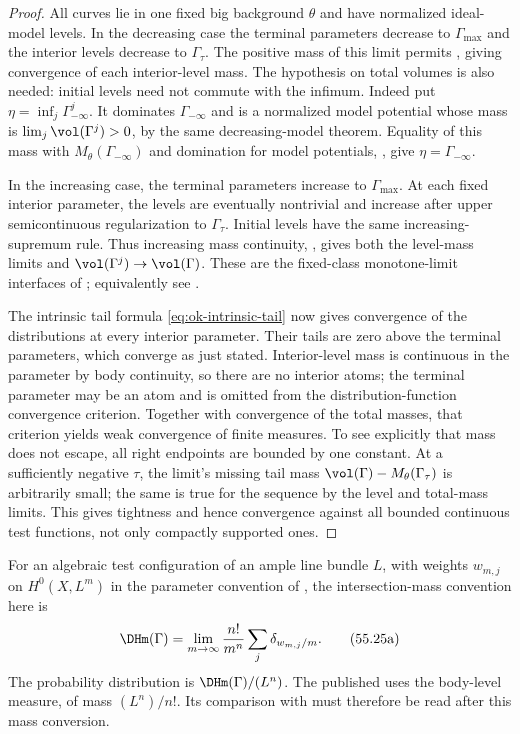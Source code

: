 \begin{proof}
All curves lie in one fixed big background $\theta$ and have normalized
ideal-model levels.  In the decreasing case the terminal parameters decrease
to $\Gamma_{\max}$ and the interior levels decrease to $\Gamma_\tau$.
The positive mass of this limit permits
\cite[Proposition~3.1.12 and Corollary~6.2.6]{XiaBook}, giving convergence
of each interior-level mass.  The hypothesis on total volumes is also needed:
initial levels need not commute with the infimum.
Indeed put $\eta=\inf_j\Gamma^j_{-\infty}$.  It dominates
$\Gamma_{-\infty}$ and is a normalized model potential whose mass is
$\lim_j\vol(\Gamma^j)>0$, by the same decreasing-model theorem.
Equality of this mass with $M_\theta(\Gamma_{-\infty})$ and domination
for model potentials, \cite[Proposition~6.1.1]{XiaBook}, give
$\eta=\Gamma_{-\infty}$.

In the increasing case, the terminal parameters increase to
$\Gamma_{\max}$.  At each fixed interior parameter, the levels are eventually
nontrivial and increase after upper semicontinuous regularization to
$\Gamma_\tau$.  Initial levels have the same increasing-supremum rule.
Thus increasing mass continuity, , gives
both the level-mass limits and $\vol(\Gamma^j)\to\vol(\Gamma)$.
These are the fixed-class monotone-limit interfaces of
; equivalently see
\cite[Proposition~13.3.1]{XiaBook}.

The intrinsic tail formula \eqref{eq:ok-intrinsic-tail} now gives convergence
of the distributions at every interior parameter.  Their tails are zero
above the terminal parameters, which converge as just stated.
Interior-level mass is continuous in the parameter by body continuity, so
there are no interior atoms; the terminal parameter may be an atom and is
omitted from the distribution-function convergence criterion.
Together with convergence of the total masses, that criterion yields weak
convergence of finite measures.  To see explicitly that mass does not escape,
all right endpoints are bounded by one constant.  At a sufficiently negative
$\tau$, the limit's missing tail mass
$\vol(\Gamma)-M_\theta(\Gamma_\tau)$ is arbitrarily small; the same is true
for the sequence by the level and total-mass limits.
This gives tightness and hence convergence against all bounded continuous
test functions, not only compactly supported ones.
\end{proof}

For an algebraic test configuration of an ample line bundle $L$, with
weights $w_{m,j}$ on $H^0(X,L^m)$ in the parameter convention of
, the intersection-mass convention here is
\[
 \DHm(\Gamma)
 =\lim_{m\to\infty}\frac{n!}{m^n}\sum_j\delta_{w_{m,j}/m}.
\tag{55.25a}\label{eq:ok-dh-weight-normalization}
\]
The probability distribution is $\DHm(\Gamma)/(L^n)$.
The published \cite[Definitions~7.6--7.8, Theorem~7.9 and
Remark~7.17]{Xia21} uses the body-level measure, of mass $(L^n)/n!$.
Its comparison with \cite[Section~3.2]{BHJ17} must therefore be read after
this mass conversion.

